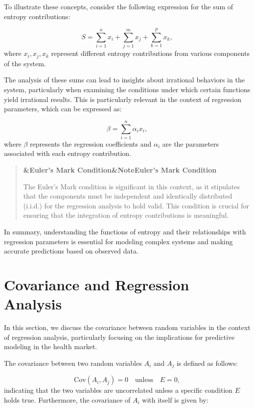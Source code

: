 \documentclass[a4paper]{article}
\newcommand{\boxheading}[1]{%
  \par\smallskip
  \noindent\textbf{\ifx&#1&Note\else#1\fi}\par
  \smallskip
}
\newenvironment{rembox}[1][]{%
  \begin{quote}\color{black!70}\boxheading{#1}\normalcolor
}{\end{quote}}
\begin{document}
To illustrate these concepts, consider the following expression for the sum of entropy contributions:

\begin{equation}
S = \sum_{i=1}^{n} x_i + \sum_{j=1}^{m} x_j + \sum_{k=1}^{p} x_k,
\end{equation}
where \( x_i, x_j, x_k \) represent different entropy contributions from various components of the system.

The analysis of these sums can lead to insights about irrational behaviors in the system, particularly when examining the conditions under which certain functions yield irrational results. This is particularly relevant in the context of regression parameters, which can be expressed as:

\begin{equation}
\beta = \sum_{i=1}^{n} \alpha_i x_i,
\end{equation}
where \( \beta \) represents the regression coefficients and \( \alpha_i \) are the parameters associated with each entropy contribution.

\begin{rembox}[Euler's Mark Condition]
The Euler's Mark condition is significant in this context, as it stipulates that the components must be independent and identically distributed (i.i.d.) for the regression analysis to hold valid. This condition is crucial for ensuring that the integration of entropy contributions is meaningful.
\end{rembox}

In summary, understanding the functions of entropy and their relationships with regression parameters is essential for modeling complex systems and making accurate predictions based on observed data.

\section{Covariance and Regression Analysis}
In this section, we discuss the covariance between random variables in the context of regression analysis, particularly focusing on the implications for predictive modeling in the health market.

The covariance between two random variables \( A_i \) and \( A_j \) is defined as follows:

\begin{equation}
\text{Cov}(A_i, A_j) = 0 \quad \text{unless} \quad E = 0,
\end{equation}
indicating that the two variables are uncorrelated unless a specific condition \( E \) holds true. Furthermore, the covariance of \( A_i \) with itself is given by:
\end{document}
